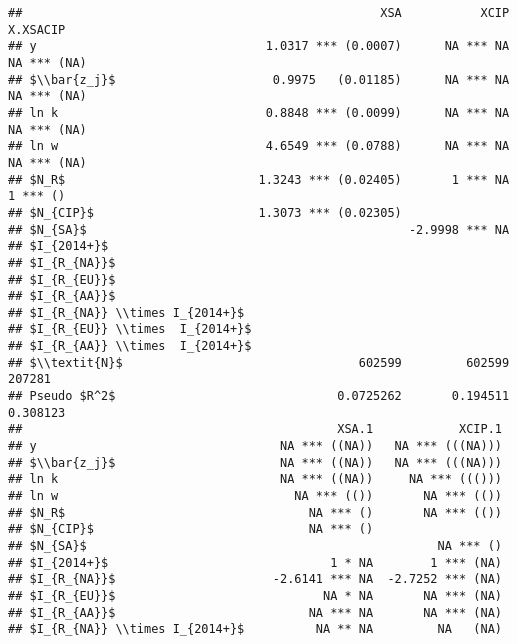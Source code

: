 \documentclass[
]{article}
\begin{document}
\begin{verbatim}
##                                                  XSA           XCIP    X.XSACIP
## y                                1.0317 *** (0.0007)      NA *** NA NA *** (NA)
## $\\bar{z_j}$                      0.9975   (0.01185)      NA *** NA NA *** (NA)
## ln k                             0.8848 *** (0.0099)      NA *** NA NA *** (NA)
## ln w                             4.6549 *** (0.0788)      NA *** NA NA *** (NA)
## $N_R$                           1.3243 *** (0.02405)       1 *** NA    1 *** ()
## $N_{CIP}$                       1.3073 *** (0.02305)                           
## $N_{SA}$                                             -2.9998 *** NA            
## $I_{2014+}$                                                                    
## $I_{R_{NA}}$                                                                   
## $I_{R_{EU}}$                                                                   
## $I_{R_{AA}}$                                                                   
## $I_{R_{NA}} \\times I_{2014+}$                                                 
## $I_{R_{EU}} \\times  I_{2014+}$                                                
## $I_{R_{AA}} \\times  I_{2014+}$                                                
## $\\textit{N}$                                 602599         602599      207281
## Pseudo $R^2$                               0.0725262       0.194511    0.308123
##                                            XSA.1            XCIP.1
## y                                  NA *** ((NA))   NA *** (((NA)))
## $\\bar{z_j}$                       NA *** ((NA))   NA *** (((NA)))
## ln k                               NA *** ((NA))     NA *** ((()))
## ln w                                 NA *** (())       NA *** (())
## $N_R$                                  NA *** ()       NA *** (())
## $N_{CIP}$                              NA *** ()                  
## $N_{SA}$                                                 NA *** ()
## $I_{2014+}$                               1 * NA        1 *** (NA)
## $I_{R_{NA}}$                      -2.6141 *** NA  -2.7252 *** (NA)
## $I_{R_{EU}}$                             NA * NA       NA *** (NA)
## $I_{R_{AA}}$                           NA *** NA       NA *** (NA)
## $I_{R_{NA}} \\times I_{2014+}$          NA ** NA         NA   (NA)

\end{verbatim}
\end{document}
